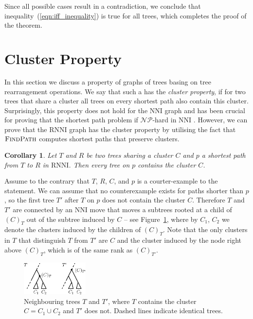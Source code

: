 \documentclass[11pt]{amsart}
\newtheorem{corollary}{Corollary}
\newcommand{\rnni}{\mathrm{RNNI}}
\newcommand{\findpath}{\textsc{FindPath}}
\newcommand{\nni}{\mathrm{NNI}}
\newcommand{\np}{\mathcal{NP}}
\newcommand{\summary}[1]{} %
\begin{document}
Since all possible cases result in a contradiction, we conclude that inequality~(\ref{eqn:iff_inequality}) is true for all trees, which completes the proof of the theorem.
\endproof


\section{Cluster Property}

\summary{Some words on the cluster property}
In this section we discuss a property of graphs of trees basing on tree rearrangement operations.
We say that such a has the \emph{cluster property}, if for two trees that share a cluster all trees on every shortest path also contain this cluster.
Surprisingly, this property does not hold for the $\nni$ graph \autocite{Li1996-zw} and has been crucial for proving that the shortest path problem if $\np$-hard in $\nni$ \autocite{Dasgupta2000-xa}.
However, we can prove that the $\rnni$ graph has the cluster property by utilising the fact that $\findpath$ computes shortest paths that preserve clusters.

\summary{Proving the Cluster Property for $\rnni$}

\begin{corollary}
	Let $T$ and $R$ be two trees sharing a cluster $C$ and $p$ a shortest path from $T$ to $R$ in $\rnni$.
	Then every tree on $p$ contains the cluster $C$.
	\label{cluster_thm}
\end{corollary}

\proof
	Assume to the contrary that $T$, $R$, $C$, and $p$ is a courter-example to the statement.
	We can assume that no counterexample exists for paths shorter than $p$, so the first tree $T'$ after $T$ on $p$ does not contain the cluster $C$.
	Therefore $T$ and $T'$ are connected by an $\nni$ move that moves a subtrees rooted at a child of $(C)_T$ out of the subtree induced by $C$ -- see Figure~\ref{fig:cluster_thm_proof}, where by $C_1$, $C_2$ we denote the clusters induced by the children of $(C)_T$.
	Note that the only clusters in $T$ that distinguish $T$ from $T'$ are $C$ and the cluster induced by the node right above $(C)_{T}$, which is of the same rank as $(C)_{T'}$.

	\begin{figure}[ht]
	\centering
	\includegraphics[width=0.3\textwidth]{cluster_thm_proof}
	\caption{Neighbouring trees $T$ and $T'$, where $T$ contains the cluster $C = C_1 \cup C_2$ and $T'$ does not.
	Dashed lines indicate identical trees.}
	\label{fig:cluster_thm_proof}
	\end{figure}
\end{document}
